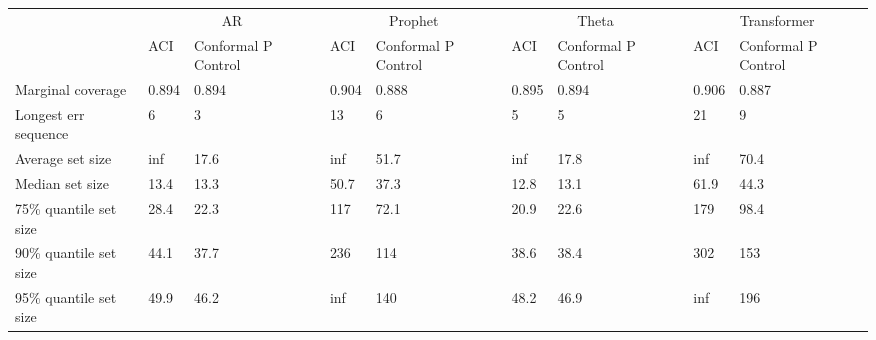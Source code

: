 \begin{tabular}{lllllllll}
\toprule
& \multicolumn{2}{c}{AR}& \multicolumn{2}{c}{Prophet}& \multicolumn{2}{c}{Theta}& \multicolumn{2}{c}{Transformer} \\
& ACI & Conformal P Control & ACI & Conformal P Control & ACI & Conformal P Control & ACI & Conformal P Control \\
\midrule
Marginal coverage & 0.894 & 0.894 & 0.904 & 0.888 & 0.895 & 0.894 & 0.906 & 0.887 \\
Longest err sequence & 6 & 3 & 13 & 6 & 5 & 5 & 21 & 9 \\
Average set size & inf & 17.6 & inf & 51.7 & inf & 17.8 & inf & 70.4 \\
Median set size & 13.4 & 13.3 & 50.7 & 37.3 & 12.8 & 13.1 & 61.9 & 44.3 \\
75\% quantile set size & 28.4 & 22.3 & 117 & 72.1 & 20.9 & 22.6 & 179 & 98.4 \\
90\% quantile set size & 44.1 & 37.7 & 236 & 114 & 38.6 & 38.4 & 302 & 153 \\
95\% quantile set size & 49.9 & 46.2 & inf & 140 & 48.2 & 46.9 & inf & 196 \\
\bottomrule
\end{tabular}
